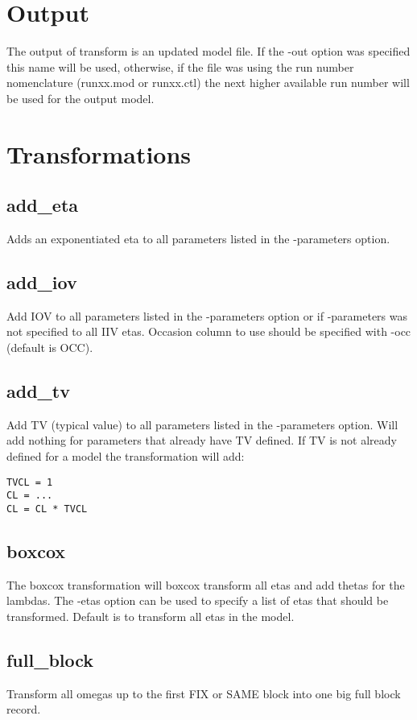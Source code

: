 \section{Output}
The output of transform is an updated model file. If the -out option was specified this name will be used, otherwise, if the file was using the run number nomenclature (runxx.mod or runxx.ctl) the next higher available run number will be used for the output model.

\section{Transformations}
\subsection{add\_eta}
Adds an exponentiated eta to all parameters listed in the -parameters option.

\subsection{add\_iov}
Add IOV to all parameters listed in the -parameters option or if -parameters was not specified to all IIV etas. Occasion column to use should be specified with -occ (default is OCC).

\subsection{add\_tv}
Add TV (typical value) to all parameters listed in the -parameters option. Will add nothing for parameters that already have TV defined. If TV is not already defined for a model the transformation will add:
\begin{verbatim}
TVCL = 1
CL = ...
CL = CL * TVCL
\end{verbatim}

\subsection{boxcox}
The boxcox transformation will boxcox transform all etas and add thetas for the lambdas. The -etas option can be used to specify a list of etas that should be transformed. Default is to transform all etas in the model.

\subsection{full\_block}
Transform all omegas up to the first FIX or SAME block into one big full block record.

